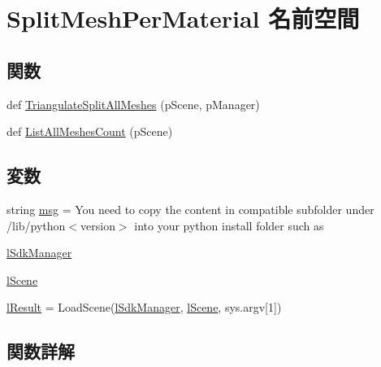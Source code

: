 \hypertarget{namespace_split_mesh_per_material}{}\section{Split\+Mesh\+Per\+Material 名前空間}
\label{namespace_split_mesh_per_material}
\subsection*{関数}
\begin{DoxyCompactItemize}
\item 
def \hyperlink{namespace_split_mesh_per_material_a08475e898c81fcec1dadbf5922038767}{Triangulate\+Split\+All\+Meshes} (p\+Scene, p\+Manager)
\item 
def \hyperlink{namespace_split_mesh_per_material_a467e90792baafb74d0f17faa2c8cab18}{List\+All\+Meshes\+Count} (p\+Scene)
\end{DoxyCompactItemize}
\subsection*{変数}
\begin{DoxyCompactItemize}
\item 
string \hyperlink{namespace_split_mesh_per_material_a4533a0c5945a87a09fcf2ca148e4a926}{msg} = \textquotesingle{}You need to copy the content in compatible subfolder under /lib/python$<$version$>$ into your python install folder such as \textquotesingle{}
\item 
\hyperlink{namespace_split_mesh_per_material_ab119485698508975c2ebbdc9464143bf}{l\+Sdk\+Manager}
\item 
\hyperlink{namespace_split_mesh_per_material_a3318434e073ac3f95a18d2596620937d}{l\+Scene}
\item 
\hyperlink{namespace_split_mesh_per_material_af6533954531a3f4f83b407c90668c26a}{l\+Result} = Load\+Scene(\hyperlink{namespace_split_mesh_per_material_ab119485698508975c2ebbdc9464143bf}{l\+Sdk\+Manager}, \hyperlink{namespace_split_mesh_per_material_a3318434e073ac3f95a18d2596620937d}{l\+Scene}, sys.\+argv\mbox{[}1\mbox{]})
\end{DoxyCompactItemize}


\subsection{関数詳解}
\mbox{\label{namespace_split_mesh_per_material_a467e90792baafb74d0f17faa2c8cab18}} 
